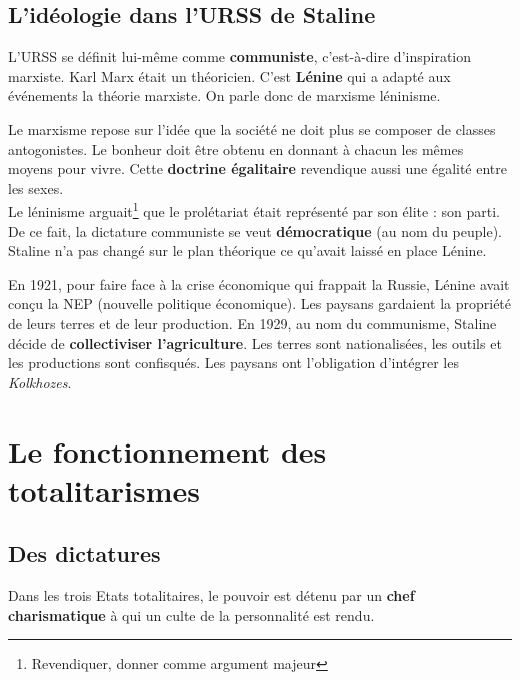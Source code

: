 \documentclass[12pt]{article}
\begin{document}
\subsection{L'idéologie dans l'URSS de Staline}

L'URSS se définit lui-même comme \textbf{communiste}, c'est-à-dire d'inspiration marxiste. Karl Marx était un théoricien. C'est \textbf{Lénine} qui a adapté aux événements la théorie marxiste. On parle donc de marxisme léninisme.

Le marxisme repose sur l'idée que la société ne doit plus se composer de classes antogonistes. Le bonheur doit être obtenu en donnant à chacun les mêmes moyens pour vivre. Cette \textbf{doctrine égalitaire} revendique aussi une égalité entre les sexes.\\
Le léninisme arguait\footnote{Revendiquer, donner comme argument majeur}  que le prolétariat était représenté par son élite : son parti. De ce fait, la dictature communiste se veut \textbf{démocratique} (au nom du peuple). Staline n'a pas changé sur le plan théorique ce qu'avait laissé en place Lénine.

En 1921, pour faire face à la crise économique qui frappait la Russie, Lénine avait conçu la NEP (nouvelle politique économique). Les paysans gardaient la propriété de leurs terres et de leur production. En 1929, au nom du communisme, Staline décide de \textbf{collectiviser l'agriculture}. Les terres sont nationalisées, les outils et les productions sont confisqués. Les paysans ont l'obligation d'intégrer les \emph{Kolkhozes}.

\section{Le fonctionnement des totalitarismes}

\subsection{Des dictatures}

Dans les trois Etats totalitaires, le pouvoir est détenu par un \textbf{chef charismatique} à qui un culte de la personnalité est rendu.
\end{document}
